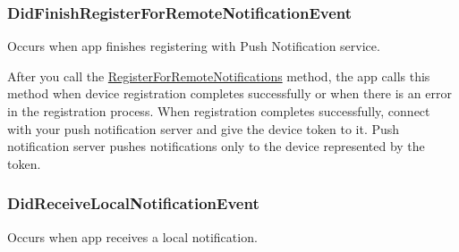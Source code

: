 \subsubsection[{Did\+Finish\+Register\+For\+Remote\+Notification\+Event}]{ Did\+Finish\+Register\+For\+Remote\+Notification\+Event\hspace{0.3cm}{\ttfamily [static]}}\label{class_voxel_busters_1_1_native_plugins_1_1_notification_service_a6c46acbf61e90252864bf46037c8a42b}


Occurs when app finishes registering with Push Notification service. 

After you call the \hyperlink{class_voxel_busters_1_1_native_plugins_1_1_notification_service_ab0d332cef9e48924c9b4c10e8a3bf534}{Register\+For\+Remote\+Notifications} method, the app calls this method when device registration completes successfully or when there is an error in the registration process. When registration completes successfully, connect with your push notification server and give the device token to it. Push notification server pushes notifications only to the device represented by the token.  \hypertarget{class_voxel_busters_1_1_native_plugins_1_1_notification_service_a7c1e2f29f0d6ce01cbda2a7b46bec757}{}
\subsubsection[{Did\+Receive\+Local\+Notification\+Event}]{ Did\+Receive\+Local\+Notification\+Event\hspace{0.3cm}{\ttfamily [static]}}\label{class_voxel_busters_1_1_native_plugins_1_1_notification_service_a7c1e2f29f0d6ce01cbda2a7b46bec757}


Occurs when app receives a local notification. 

\hypertarget{class_voxel_busters_1_1_native_plugins_1_1_notification_service_afe03cd020860a6733c2262133e082610}{}

